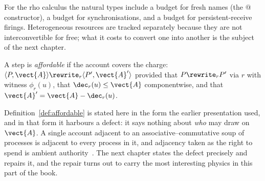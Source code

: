 For the rho calculus the natural types include a budget for fresh names
(the $@$ constructor), a budget for synchronisations, and a budget for
persistent-receive firings.  Heterogeneous resources are tracked
separately because they are not interconvertible for free; what it costs
to convert one into another is the subject of the next chapter.

\begin{definition}
\label{def:affordable}
A step is \emph{affordable} if the account covers the charge:
$\langle P, \vect{A}\rangle \rewrite_r \langle P', \vect{A}'\rangle$
provided that $P \rewrite_r P'$ via $r$ with witness $\phi_r(u)$, that
$\dec_r(u) \leq \vect{A}$ componentwise, and that
$\vect{A}' = \vect{A} - \dec_r(u)$.
\end{definition}

Definition~\ref{def:affordable} is stated here in the form the earlier
presentation used, and in that form it harbours a defect: it says nothing
about \emph{who} may draw on $\vect{A}$.  A single account adjacent to an
associative--commutative soup of processes is adjacent to every process in
it, and adjacency taken as the right to spend is ambient
authority~\cite{finrho}.  The next chapter states the defect precisely and
repairs it, and the repair turns out to carry the most interesting physics
in this part of the book.

